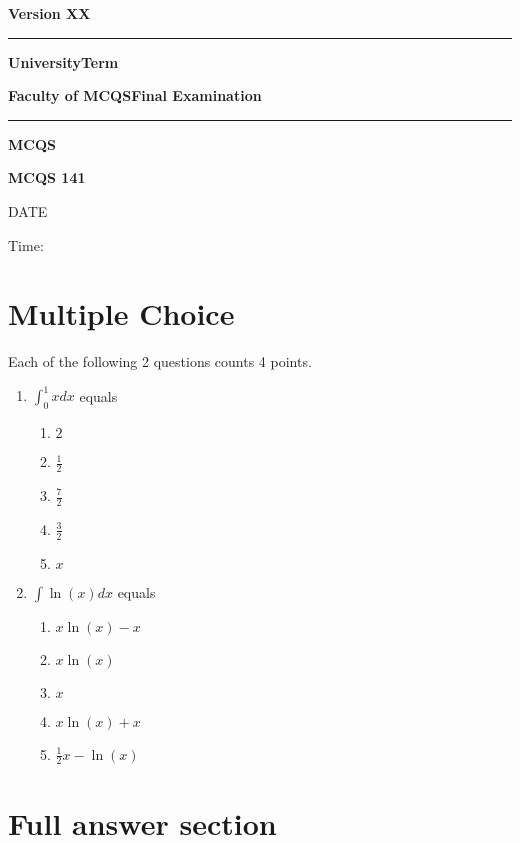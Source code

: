 \documentclass[11pt]{article}
\newcommand{\correct}
{
}
\begin{document}
\newpage
\thispagestyle{empty}
\textbf{Version XX}\\
\hrule\bigskip

{\Large \bf University}\hfill {\Large \bf Term}\medskip

{\Large \bf Faculty of MCQS}\hfill {\Large \bf Final Examination}
\bigskip

\hrule
\medskip

\vskip 1cm

 \begin{center}{\Large \bf MCQS%
\bigskip

{\large \bf MCQS 141}%
\bigskip

DATE %
\medskip

Time: } %
\end{center}

\newpage

\section{Multiple Choice}

Each of the following 2 questions counts 4 points.

\begin{enumerate}
\item $\int_0^1 x dx$ equals\\
  \begin{multicols}{5} 
  \begin{enumerate}
  \item $2$
  \item $\frac{1}{2}$\correct
  \item $\frac{7}{2}$
  \item $\frac{3}{2}$
  \item $x$
  \end{enumerate}
  \end{multicols}

\item $\int \ln(x) dx$ equals\\
  \begin{multicols}{5} 
  \begin{enumerate}
  \item $x\ln(x)-x$\correct
  \item $x\ln(x)$
  \item $x$
  \item $x\ln(x)+x$
  \item $\frac{1}{2}x-\ln(x)$
  \end{enumerate}
  \end{multicols}


\end{enumerate}

\newpage
\section{Full answer section}
\end{document}
